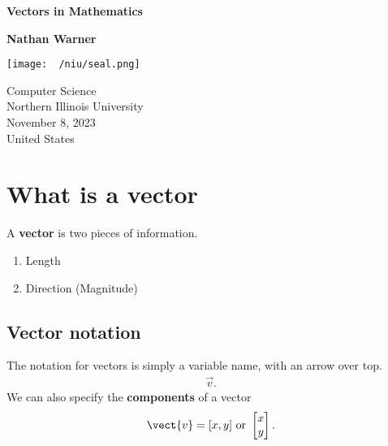 \documentclass{report}
\title{\Huge{}}
\author{\huge{Nathan Warner}}
\date{\huge{}}
\begin{document}
        \begin{titlepage}
       \begin{center}
           \vspace*{1cm}
    
           \textbf{Vectors in Mathematics}
    
           \vspace{0.5cm}
            
                
           \vspace{1.5cm}
    
           \textbf{Nathan Warner}
    
           \vfill
                
                
           \vspace{0.8cm}
         
           \texttt{[image: ~/niu/seal.png]}
                
           Computer Science \\
           Northern Illinois University\\
           November 8, 2023 \\
           United States\\
           
                
       \end{center}
    \end{titlepage}
    \tableofcontents
    \pagebreak \bigbreak \noindent
    \section{\LARGE What is a vector}
    \bigbreak \noindent 
        A \textbf{vector} is two pieces  of information. 
        \begin{enumerate}
            \item Length 
            \item Direction (Magnitude)
        \end{enumerate}

    \bigbreak \noindent 
    \subsection{Vector notation}
    \bigbreak \noindent 
    The notation for vectors is simply a variable name, with an arrow over top.
    \begin{align*}
        \vec{v}
    .\end{align*}
    We can also specify the \textbf{components} of a vector
    \begin{align*}
        \vect{v} = [x,y] \text{ or } 
        \begin{bmatrix}
            x \\ y
        \end{bmatrix}
    .\end{align*}
    \bigbreak \noindent 
\end{document}
